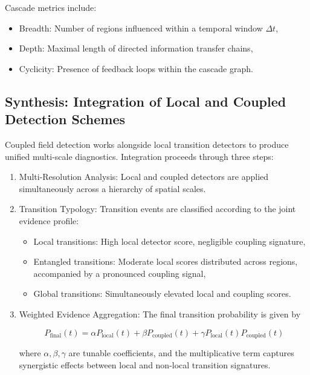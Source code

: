 Cascade metrics include:
\begin{itemize}
    \item Breadth: Number of regions influenced within a temporal window \(\Delta t\),
    \item Depth: Maximal length of directed information transfer chains,
    \item Cyclicity: Presence of feedback loops within the cascade graph.
\end{itemize}

\subsection{Synthesis: Integration of Local and Coupled Detection Schemes}

Coupled field detection works alongside local transition detectors to produce unified multi-scale diagnostics. Integration proceeds through three steps:

\begin{enumerate}
    \item Multi-Resolution Analysis: Local and coupled detectors are applied simultaneously across a hierarchy of spatial scales.

    \item Transition Typology: Transition events are classified according to the joint evidence profile:
    \begin{itemize}
        \item Local transitions: High local detector score, negligible coupling signature,
        \item Entangled transitions: Moderate local scores distributed across regions, accompanied by a pronounced coupling signal,
        \item Global transitions: Simultaneously elevated local and coupling scores.
    \end{itemize}

    \item Weighted Evidence Aggregation: The final transition probability is given by

    \begin{equation}
    P_{\text{final}}(t) = \alpha P_{\text{local}}(t) + \beta P_{\text{coupled}}(t) + \gamma P_{\text{local}}(t) P_{\text{coupled}}(t)
    \end{equation}

    where \(\alpha, \beta, \gamma\) are tunable coefficients, and the multiplicative term captures synergistic effects between local and non-local transition signatures.
\end{enumerate}

